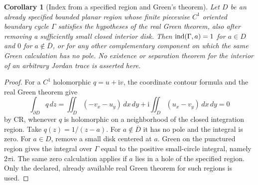 \documentclass[11pt,a4paper,openany]{book}
\newtheorem{corollary}[theorem]{Corollary}
\theoremstyle{definition}
\theoremstyle{remark}\newtheorem{remark}[theorem]{Remark}
\newcommand{\dd}{\,d}\newcommand{\iu}{\mathrm i}
\begin{document}
\begin{corollary}[Index from a specified region and Green's theorem]\label{d12:04:green-index}
Let \(D\) be an already specified bounded planar region whose finite
piecewise \(C^1\) oriented boundary cycle \(\Gamma\) satisfies the
hypotheses of the real Green theorem, also after removing a sufficiently
small closed interior disk. Then
\(\operatorname{ind}(\Gamma,a)=1\) for \(a\in D\) and \(0\) for
\(a\notin\overline D\), or for any other complementary component on
which the same Green calculation has no pole.
No existence or separation theorem for the interior of an arbitrary
Jordan trace is asserted here.
\end{corollary}
\begin{proof}
For a \(C^1\) holomorphic \(q=u+\iu v\), the coordinate contour formula
and the real Green theorem give
\[
 \int_{\partial D}q\dd z
 =\iint_D(-v_x-u_y)\dd x\dd y+
       \iu\iint_D(u_x-v_y)\dd x\dd y=0
\]
by CR, whenever \(q\) is holomorphic on a neighborhood of the closed
integration region. Take \(q(z)=1/(z-a)\).
For \(a\notin\overline D\) it has no pole and the integral is zero.
For \(a\in D\), remove a small disk centered at \(a\). Green on the
punctured region gives the integral over \(\Gamma\) equal to the
positive small-circle integral, namely \(2\pi\iu\).
The same zero calculation applies if \(a\) lies in a hole of the
specified region. Only the declared, already available real Green
theorem for such regions is used.
\end{proof}
\end{document}
